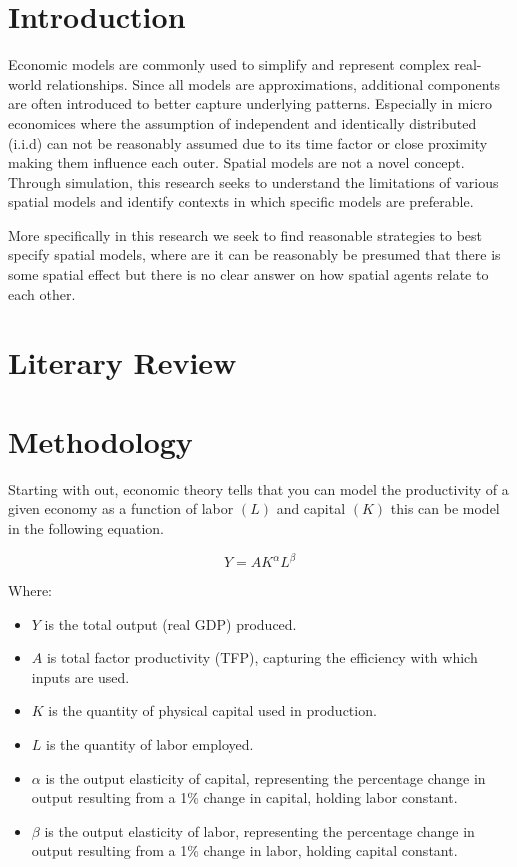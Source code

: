 \documentclass{article}
\begin{document}
\section{Introduction}

Economic models are commonly used to simplify and represent complex real-world relationships.
Since all models are approximations, additional components are often introduced to better capture
underlying patterns. Especially in micro economices where the assumption of independent and identically
distributed (i.i.d) can not be reasonably assumed due to its time factor or close proximity making
them influence each outer. Spatial models are not a novel concept. Through simulation,
this research seeks to understand the limitations of various spatial models and identify contexts in
which specific models are preferable.

More specifically in this research we seek to find reasonable strategies to best specify spatial models,
where are it can be reasonably be presumed that there is some spatial effect but there is no clear answer
on how spatial agents relate to each other.

\section{Literary Review}


\section{Methodology}

Starting with out, economic theory tells that you can model the productivity of a given economy as a function
of labor $(L)$ and capital $(K)$ this can be model in the following equation.

$$
	Y = A K^\alpha L^\beta
$$

Where:
\begin{itemize}
	\item $Y$ is the total output (real GDP) produced.
	\item $A$ is total factor productivity (TFP), capturing the efficiency with which inputs are used.
	\item $K$ is the quantity of physical capital used in production.
	\item $L$ is the quantity of labor employed.
	\item $\alpha$ is the output elasticity of capital, representing the percentage change in output
	      resulting from a 1\% change in capital, holding labor constant.
	\item $\beta$ is the output elasticity of labor, representing the percentage change in output
	      resulting from a 1\% change in labor, holding capital constant.
\end{itemize}
\end{document}
